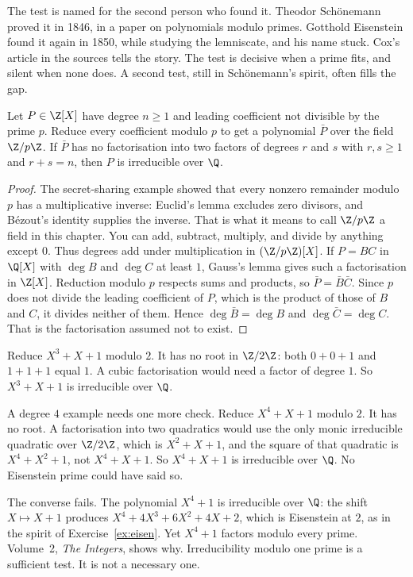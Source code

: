 The test is named for the second person who found it. Theodor Sch\"onemann proved it in 1846, in a paper on polynomials modulo primes. Gotthold Eisenstein found it again in 1850, while studying the lemniscate, and his name stuck. Cox's article in the sources tells the story. The test is decisive when a prime fits, and silent when none does. A second test, still in Sch\"onemann's spirit, often fills the gap.

\begin{propositionx}\label{prop:reduction}
Let $P\in\Z[X]$ have degree $n\ge1$ and leading coefficient not divisible by the prime $p$. Reduce every coefficient modulo $p$ to get a polynomial $\bar P$ over the field $\Z/p\Z$. If $\bar P$ has no factorisation into two factors of degrees $r$ and $s$ with $r,s\ge1$ and $r+s=n$, then $P$ is irreducible over $\Q$.
\end{propositionx}
\begin{proof}
The secret-sharing example showed that every nonzero remainder modulo $p$ has a multiplicative inverse: Euclid's lemma excludes zero divisors, and B\'ezout's identity supplies the inverse. That is what it means to call $\Z/p\Z$ a field in this chapter. You can add, subtract, multiply, and divide by anything except $0$. Thus degrees add under multiplication in $(\Z/p\Z)[X]$. If $P=BC$ in $\Q[X]$ with $\deg B$ and $\deg C$ at least $1$, Gauss's lemma gives such a factorisation in $\Z[X]$. Reduction modulo $p$ respects sums and products, so $\bar P=\bar B\bar C$. Since $p$ does not divide the leading coefficient of $P$, which is the product of those of $B$ and $C$, it divides neither of them. Hence $\deg\bar B=\deg B$ and $\deg\bar C=\deg C$. That is the factorisation assumed not to exist.
\end{proof}

\begin{examplex}
Reduce $X^3+X+1$ modulo $2$. It has no root in $\Z/2\Z$: both $0+0+1$ and $1+1+1$ equal $1$. A cubic factorisation would need a factor of degree $1$. So $X^3+X+1$ is irreducible over $\Q$.

A degree $4$ example needs one more check. Reduce $X^4+X+1$ modulo $2$. It has no root. A factorisation into two quadratics would use the only monic irreducible quadratic over $\Z/2\Z$, which is $X^2+X+1$, and the square of that quadratic is $X^4+X^2+1$, not $X^4+X+1$. So $X^4+X+1$ is irreducible over $\Q$. No Eisenstein prime could have said so.

The converse fails. The polynomial $X^4+1$ is irreducible over $\Q$: the shift $X\mapsto X+1$ produces $X^4+4X^3+6X^2+4X+2$, which is Eisenstein at $2$, as in the spirit of Exercise~\ref{ex:eisen}. Yet $X^4+1$ factors modulo every prime. Volume~2, \emph{The Integers}, shows why. Irreducibility modulo one prime is a sufficient test. It is not a necessary one.
\end{examplex}

